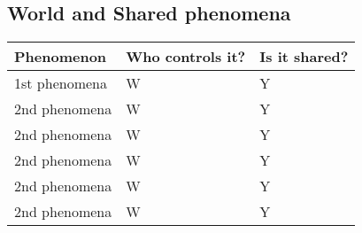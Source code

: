 \subsection{World and Shared phenomena}

\begin{tabular}{ |p{3cm}|p{3cm}|p{3cm}|  }
\hline
\rowcolor{white!40!blue!70}
Phenomenon & Who controls it? & Is it shared?\\
\hline
1st phenomena & W & Y \\
2nd phenomena & W & Y \\
2nd phenomena & W & Y \\
2nd phenomena & W & Y \\
2nd phenomena & W & Y \\
2nd phenomena & W & Y \\
\hline
\end{tabular}